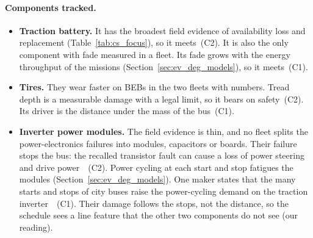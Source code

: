 \documentclass[11pt,a4paper]{article}
\theoremstyle{plain}
\theoremstyle{definition}
\theoremstyle{remark}
\begin{document}
\paragraph{Components tracked.}
\begin{itemize}
  \item \textbf{Traction battery.}
    It has the broadest field evidence of availability loss and replacement (Table~\ref{tab:cs_focus}), so it meets~(C2).
    It is also the only component with fade measured in a fleet.
    Its fade grows with the energy throughput of the missions (Section~\ref{sec:ev_deg_models}), so it meets~(C1).
  \item \textbf{Tires.}
    They wear faster on BEBs in the two fleets with numbers.
    Tread depth is a measurable damage with a legal limit, so it bears on safety~(C2).
    Its driver is the distance under the mass of the bus~(C1).
  \item \textbf{Inverter power modules.}
    The field evidence is thin, and no fleet splits the power-electronics failures into modules, capacitors or boards.
    Their failure stops the bus: the recalled transistor fault can cause a loss of power steering and drive power~\cite{NHTSA2023recall}~(C2).
    Power cycling at each start and stop fatigues the modules (Section~\ref{sec:ev_deg_models}).
    One maker states that the many starts and stops of city buses raise the power-cycling demand on the traction inverter~\cite{Backhaus2019}~(C1).
    Their damage follows the stops, not the distance, so the schedule sees a line feature that the other two components do not see (our reading).
\end{itemize}
\end{document}

